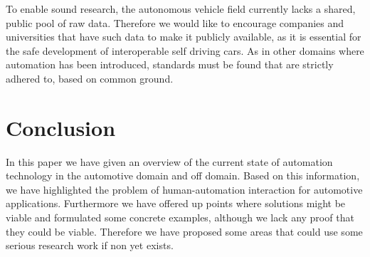 \documentclass{acm_proc_article-sp}
\begin{document}
To enable sound research, the autonomous vehicle field currently lacks a shared, public pool of raw data.
Therefore we would like to encourage companies and universities that have such data to make it publicly available, as it is essential for the safe development of interoperable self driving cars.
As in other domains where automation has been introduced, standards must be found that are strictly adhered to, based on common ground.

\section{Conclusion}

In this paper we have given an overview of the current state of automation technology in the automotive domain and off domain.
Based on this information, we have highlighted the problem of human-automation interaction for automotive applications.
Furthermore we have offered up points where solutions might be viable and formulated some concrete examples, although we lack any proof that they could be viable.
Therefore we have proposed some areas that could use some serious research work if non yet exists.


  

\balancecolumns
\end{document}
